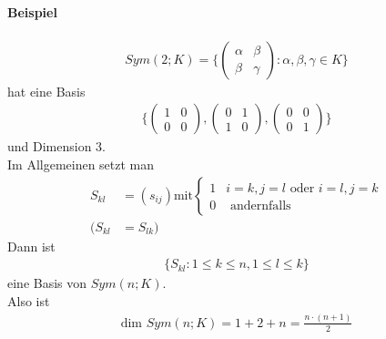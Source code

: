 \documentclass[11pt]{report}
\begin{document}
\paragraph{Beispiel}
\begin{align}
 Sym(2;K) = \{\begin{pmatrix} \alpha & \beta \\ \beta & \gamma \end{pmatrix}: \alpha, \beta, \gamma \in K\}
\end{align}
hat eine Basis
\begin{align}
 \{\begin{pmatrix} 1 & 0 \\ 0 & 0 \end{pmatrix} , \begin{pmatrix} 0 & 1 \\ 1 & 0 \end{pmatrix}, \begin{pmatrix} 0 & 0 \\ 0 & 1 \end{pmatrix}\}
\end{align}
und Dimension 3.\\
Im Allgemeinen setzt man
\begin{align}
 S_{kl} &=  (s_{ij}) \text{mit} \left\{ \begin{matrix} 1 & i=k, j=l \text{ oder } i=l, j=k \\ 0 & \text{ andernfalls }\end{matrix} \right.\\
(S_{kl} &= S_{lk})
\end{align}
Dann ist 
\begin{align}
\{S_{kl}: 1 \leq k \leq n, 1 \leq l \leq k \}
\end{align}
eine Basis von $Sym(n;K)$. \\
Also ist
\begin{align}
\text{dim } Sym(n;K) = 1 + 2 + n = \frac{n\cdot (n+1)}{2}
\end{align}

\end{document}
